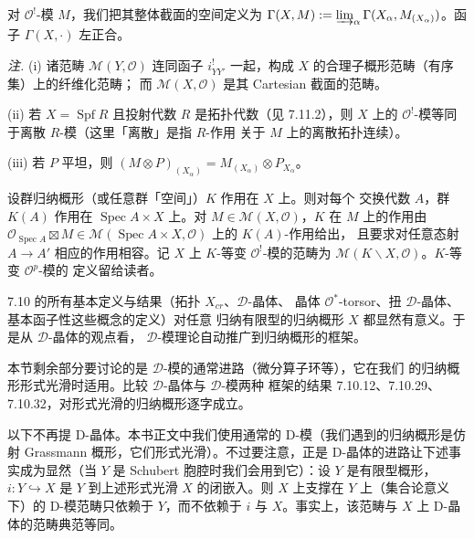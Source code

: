 对 $\mathcal{O}^{!}$-模 $M$，我们把其整体截面的空间定义为
$\Gamma(X,M):=\varinjlim_\alpha\Gamma(X_\alpha,M_{(X_\alpha)})$。函子
$\Gamma(X,\cdot)$ 左正合。

\emph{注.} (i) 诸范畴 $\mathcal{M}(Y,\mathcal{O})$ 连同函子
$i^{!}_{YY'}$ 一起，构成 $X$ 的合理子概形范畴（有序集）上的纤维化范畴；
而 $\mathcal{M}(X,\mathcal{O})$ 是其 Cartesian 截面的范畴。

(ii) 若 $X=\operatorname{Spf}R$ 且投射代数 $R$ 是拓扑代数（见 7.11.2），则
$X$ 上的 $\mathcal{O}^{!}$-模等同于离散 $R$-模（这里「离散」是指 $R$-作用
关于 $M$ 上的离散拓扑连续）。

(iii) 若 $P$ 平坦，则
$(M\otimes P)_{(X_\alpha)}=M_{(X_\alpha)}\otimes P_{X_\alpha}$。

 设群归纳概形（或任意群「空间」）$K$ 作用在 $X$ 上。则对每个
交换代数 $A$，群 $K(A)$ 作用在 $\operatorname{Spec}A\times X$ 上。对
$M\in\mathcal{M}(X,\mathcal{O})$，$K$ 在 $M$ 上的作用由
$\mathcal{O}_{\operatorname{Spec}A}\boxtimes M\in
\mathcal{M}(\operatorname{Spec}A\times X,\mathcal{O})$ 上的 $K(A)$-作用给出，
且要求对任意态射 $A\to A'$ 相应的作用相容。记 $X$ 上 $K$-等变
$\mathcal{O}^{!}$-模的范畴为
$\mathcal{M}(K\backslash X,\mathcal{O})$。$K$-等变 $\mathcal{O}^{p}$-模的
定义留给读者。

 7.10 的所有基本定义与结果（拓扑 $X_{cr}$、$\mathcal{D}$-晶体、
晶体 $\mathcal{O}^*$-torsor、扭 $\mathcal{D}$-晶体、基本函子性这些概念的定义）对任意
归纳有限型的归纳概形 $X$ 都显然有意义。于是从 $\mathcal{D}$-晶体的观点看，
$\mathcal{D}$-模理论自动推广到归纳概形的框架。

本节剩余部分要讨论的是 $\mathcal{D}$-模的通常进路（微分算子环等），它在我们
的归纳概形形式光滑时适用。比较 $\mathcal{D}$-晶体与 $\mathcal{D}$-模两种
框架的结果 7.10.12、7.10.29、7.10.32，对形式光滑的归纳概形逐字成立。



以下不再提 D-晶体。本书正文中我们使用通常的 D-模（我们遇到的归纳概形是仿射 Grassmann 概形，它们形式光滑）。不过要注意，正是 D-晶体的进路让下述事实成为显然（当 $Y$ 是 Schubert 胞腔时我们会用到它）：设 $Y$ 是有限型概形，$i:Y\hookrightarrow X$ 是 $Y$ 到上述形式光滑 $X$ 的闭嵌入。则 $X$ 上支撑在 $Y$ 上（集合论意义下）的 D-模范畴只依赖于 $Y$，而不依赖于 $i$ 与 $X$。事实上，该范畴与 $X$ 上 D-晶体的范畴典范等同。

